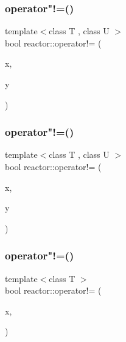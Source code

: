 \mbox{\label{namespacereactor_a247d25ed08296b3afc70c88f7f2e3b5e}} 
\subsubsection{\texorpdfstring{operator"!=()}{operator!=()}\hspace{0.1cm}{\footnotesize\ttfamily [6/11]}}
{\footnotesize\ttfamily template$<$class T , class U $>$ \\
bool reactor\+::operator!= (\begin{DoxyParamCaption}\item[{const \hyperlink{classreactor_1_1ImmutableValuePtr}{Immutable\+Value\+Ptr}$<$ T $>$ \&}]{x,  }\item[{const \hyperlink{classreactor_1_1MutableValuePtr}{Mutable\+Value\+Ptr}$<$ U $>$ \&}]{y }\end{DoxyParamCaption})}

\mbox{\label{namespacereactor_a71b00843b7797d6a9d52c3e0b85a06a7}} 
\subsubsection{\texorpdfstring{operator"!=()}{operator!=()}\hspace{0.1cm}{\footnotesize\ttfamily [7/11]}}
{\footnotesize\ttfamily template$<$class T , class U $>$ \\
bool reactor\+::operator!= (\begin{DoxyParamCaption}\item[{const \hyperlink{classreactor_1_1MutableValuePtr}{Mutable\+Value\+Ptr}$<$ T $>$ \&}]{x,  }\item[{const \hyperlink{classreactor_1_1ImmutableValuePtr}{Immutable\+Value\+Ptr}$<$ U $>$ \&}]{y }\end{DoxyParamCaption})}

\mbox{\label{namespacereactor_aeef65c8dea31e1e64d5488fbd5be4f5f}} 
\subsubsection{\texorpdfstring{operator"!=()}{operator!=()}\hspace{0.1cm}{\footnotesize\ttfamily [8/11]}}
{\footnotesize\ttfamily template$<$class T $>$ \\
bool reactor\+::operator!= (\begin{DoxyParamCaption}\item[{const \hyperlink{classreactor_1_1MutableValuePtr}{Mutable\+Value\+Ptr}$<$ T $>$ \&}]{x,  }\item[{std\+::nullptr\+\_\+t}]{ }\end{DoxyParamCaption})}

